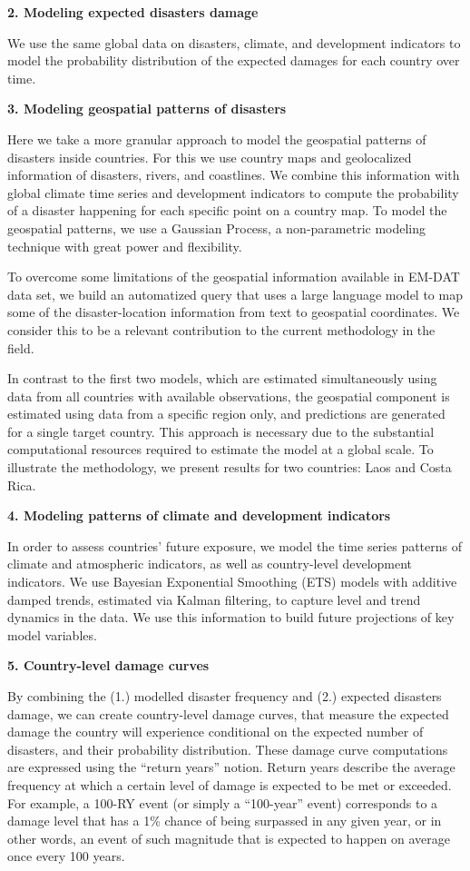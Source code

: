 \textbf{2. Modeling expected disasters damage}

We use the same global data on disasters, climate, and development indicators to model the probability distribution of the expected damages for each country over time.

\textbf{3. Modeling geospatial patterns of disasters}

Here we take a more granular approach to model the geospatial patterns of disasters inside countries. For this we use country maps and geolocalized information of disasters, rivers, and coastlines. We combine this information with global climate time series and development indicators to compute the probability of a disaster happening for each specific point on a country map. To model the geospatial patterns, we use a Gaussian Process, a non-parametric modeling technique with great power and flexibility.

To overcome some limitations of the geospatial information available in EM-DAT data set, we build an automatized query that uses a large language model to map some of the disaster-location information from text to geospatial coordinates. We consider this to be a relevant contribution to the current methodology in the field.

In contrast to the first two models, which are estimated simultaneously using data from all countries with available observations, the geospatial component is estimated using data from a specific region only, and predictions are generated for a single target country. This approach is necessary due to the substantial computational resources required to estimate the model at a global scale. To illustrate the methodology, we present results for two countries: Laos and Costa Rica.

\textbf{4. Modeling patterns of climate and development indicators}

In order to assess countries' future exposure, we model the time series patterns of climate and atmospheric indicators, as well as country-level development indicators. We use Bayesian Exponential Smoothing (ETS) models with additive damped trends, estimated via Kalman filtering, to capture level and trend dynamics in the data. We use this information to build future projections of key model variables.

\textbf{5. Country-level damage curves}

By combining the (1.) modelled disaster frequency and (2.) expected disasters damage, we can create country-level damage curves, that measure the expected damage the country will experience conditional on the expected number of disasters, and their probability distribution. These damage curve computations are expressed using the ``return years'' notion. Return years describe the average frequency at which a certain level of damage is expected to be met or exceeded. For example, a 100-RY event (or simply a ``100-year'' event) corresponds to a damage level that has a 1\% chance of being surpassed in any given year, or in other words, an event of such magnitude that is expected to happen on average once every 100 years.

